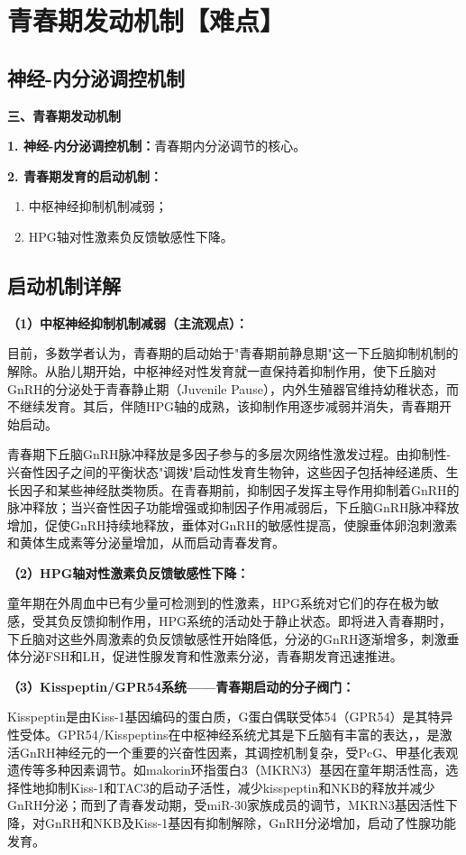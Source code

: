\section{青春期发动机制\textbf{【难点】}}

\subsection{神经-内分泌调控机制}

\begin{keybox}
\textbf{三、青春期发动机制}

\textbf{1. 神经-内分泌调控机制：}青春期内分泌调节的核心。

\textbf{2. 青春期发育的启动机制：}
\begin{enumerate}[leftmargin=*]
    \item 中枢神经抑制机制减弱；
    \item HPG轴对性激素负反馈敏感性下降。
\end{enumerate}
\end{keybox}

\subsection{启动机制详解}

\begin{keybox}
\textbf{（1）中枢神经抑制机制减弱（主流观点）：}

目前，多数学者认为，青春期的启动始于"青春期前静息期"这一下丘脑抑制机制的解除。从胎儿期开始，中枢神经对性发育就一直保持着抑制作用，使下丘脑对GnRH的分泌处于青春静止期（Juvenile Pause），内外生殖器官维持幼稚状态，而不继续发育。其后，伴随HPG轴的成熟，该抑制作用逐步减弱并消失，青春期开始启动。

青春期下丘脑GnRH脉冲释放是多因子参与的多层次网络性激发过程。由抑制性-兴奋性因子之间的平衡状态"调拨"启动性发育生物钟，这些因子包括神经递质、生长因子和某些神经肽类物质。在青春期前，抑制因子发挥主导作用抑制着GnRH的脉冲释放；当兴奋性因子功能增强或抑制因子作用减弱后，下丘脑GnRH脉冲释放增加，促使GnRH持续地释放，垂体对GnRH的敏感性提高，使腺垂体卵泡刺激素和黄体生成素等分泌量增加，从而启动青春发育。

\textbf{（2）HPG轴对性激素负反馈敏感性下降：}

童年期在外周血中已有少量可检测到的性激素，HPG系统对它们的存在极为敏感，受其负反馈抑制作用，HPG系统的活动处于静止状态。即将进入青春期时，下丘脑对这些外周激素的负反馈敏感性开始降低，分泌的GnRH逐渐增多，刺激垂体分泌FSH和LH，促进性腺发育和性激素分泌，青春期发育迅速推进。

\textbf{（3）Kisspeptin/GPR54系统——青春期启动的分子阀门：}

Kisspeptin是由Kiss-1基因编码的蛋白质，G蛋白偶联受体54（GPR54）是其特异性受体。GPR54/Kisspeptins在中枢神经系统尤其是下丘脑有丰富的表达，，是激活GnRH神经元的一个重要的兴奋性因素，其调控机制复杂，受PcG、甲基化表观遗传等多种因素调节。如makorin环指蛋白3（MKRN3）基因在童年期活性高，选择性地抑制Kiss-1和TAC3的启动子活性，减少kisspeptin和NKB的释放并减少GnRH分泌；而到了青春发动期，受miR-30家族成员的调节，MKRN3基因活性下降，对GnRH和NKB及Kiss-1基因有抑制解除，GnRH分泌增加，启动了性腺功能发育。
\end{keybox}

